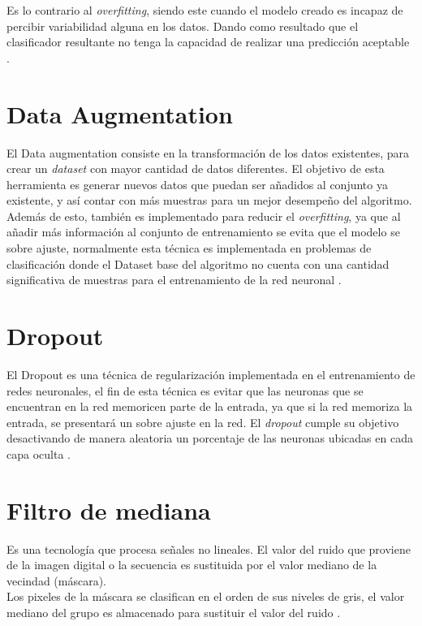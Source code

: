 Es lo contrario al \textit{overfitting}, siendo este cuando el modelo creado es incapaz de percibir variabilidad alguna en los datos. Dando como resultado que el clasificador resultante no tenga la capacidad de realizar una predicción aceptable \cite{jabbar2015methods}.

\section{Data Augmentation}
El Data augmentation consiste en la transformación de los datos existentes, para crear un \textit{dataset} con mayor cantidad de datos diferentes. El objetivo de esta herramienta es generar nuevos datos que puedan ser añadidos al conjunto ya existente, y así contar con más muestras para un mejor desempeño del algoritmo. Además de esto, también es implementado para reducir el \textit{overfitting}, ya que al añadir más información al conjunto de entrenamiento se evita que el modelo se sobre ajuste, normalmente esta técnica es implementada en problemas de clasificación donde el Dataset base del algoritmo no cuenta con una cantidad significativa de muestras para el entrenamiento de la red neuronal \cite{data}. \\



\section{Dropout}

El Dropout es una técnica de regularización implementada en el entrenamiento de redes neuronales, el fin de esta técnica es evitar que las neuronas que se encuentran en la red memoricen parte de la entrada, ya que si la red memoriza la entrada, se presentará un sobre ajuste en la red. El \textit{dropout} cumple su objetivo desactivando de manera aleatoria un porcentaje de las neuronas ubicadas en cada capa oculta \cite{drop}.

\section{Filtro de mediana}

Es una tecnología que procesa señales no lineales. El valor del ruido que proviene de la imagen digital o la secuencia es sustituida por el valor mediano de la vecindad (máscara).\\
Los pixeles de la máscara se clasifican en el orden de sus niveles de gris, el valor mediano del grupo es almacenado para sustituir el valor del ruido \cite{zhu2012improved}.

